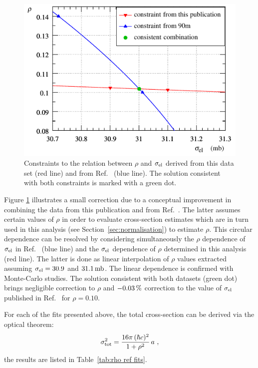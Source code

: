 \begin{figure}
\begin{center}
\includegraphics{fig/si_el_rho_solution.pdf}
\caption{%
Constraints to the relation between $\rho$ and $\sigma_{\rm el}$ derived from this data set (red line) and from Ref.~\cite{totem-13tev-90m} (blue line). The solution consistent with both constraints is marked with a green dot.
}
\label{fig:si_el rho sol}
\end{center}
\end{figure}

Figure \ref{fig:si_el rho sol} illustrates a small correction due to a conceptual improvement in combining the data from this publication and from Ref.~\cite{totem-13tev-90m}. The latter assumes certain values of $\rho$ in order to evaluate cross-section estimates which are in turn used in this analysis (see Section~\ref{sec:normalisation}) to estimate $\rho$. This circular dependence can be resolved by considering simultaneously the $\rho$ dependence of $\sigma_{\rm el}$ in Ref.~\cite{totem-13tev-90m} (blue line) and the $\sigma_{\rm el}$ dependence of $\rho$ determined in this analysis (red line). The latter is done as linear interpolation of $\rho$ values extracted assuming $\sigma_{\rm el} = 30.9$ and $31.1\,{\rm mb}$. The linear dependence is confirmed with Monte-Carlo studies. The solution consistent with both datasets (green dot) brings negligible correction to $\rho$ and $-0.03\,{\rm \%}$ correction to the value of $\sigma_{\rm el}$ published in Ref.~\cite{totem-13tev-90m} for $\rho=0.10$.


For each of the fits presented above, the total cross-section can be derived via the optical theorem:
\begin{equation}
\label{eq:si tot}
\sigma_{\rm tot}^2 = {16\pi\, (\hbar c)^2\over 1 + \rho^2}\, a\ ,
\end{equation}
the results are listed in Table~\ref{tab:rho ref fits}.

